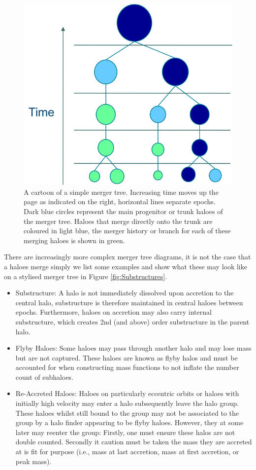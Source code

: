 \begin{figure}[h]
	\centering
	\includegraphics[width = \linewidth]{Figures/Chapter1/Merger_Tree_Simple.png}
    \caption{A cartoon of a simple merger tree. Increasing time moves up the page as indicated on the right, horizontal lines separate epochs. Dark blue circles represent the main progenitor or trunk haloes of the merger tree. Haloes that merge directly onto the trunk are coloured in light blue, the merger history or branch for each of these merging haloes is shown in green.}
	\label{fig:SimpleTree}
\end{figure}

There are increasingly more complex merger tree diagrams, it is not the case that a haloes merge simply we list some examples and show what these may look like on a stylised merger tree in Figure \ref{fig:Substructures}.

\begin{itemize}
    \item Substructure: A halo is not immediately dissolved upon accretion to the central halo, substructure is therefore maintained in central haloes between epochs. Furthermore, haloes on accretion may also carry internal substructure, which creates 2nd (and above) order substructure in the parent halo.
    \item Flyby Haloes: Some haloes may pass through another halo and may lose mass but are not captured. These haloes are known as flyby halos and must be accounted for when constructing mass functions to not inflate the number count of subhaloes.
    \item Re-Accreted Haloes: Haloes on particularly eccentric orbits or haloes with initially high velocity may enter a halo subsequently leave the halo group. These haloes whilst still bound to the group may not be associated to the group by a halo finder appearing to be flyby haloes. However, they at some later may reenter the group: Firstly, one must ensure these halos are not double counted. Secondly it caution must be taken the mass they are accreted at is fit for purpose (i.e., mass at last accretion, mass at first accretion, or peak mass).
\end{itemize}

